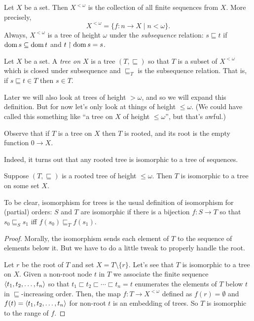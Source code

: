 \documentclass[10pt]{amsart}
\begin{document}
\begin{definition}
Let $X$ be a set. Then $X^{<\omega}$ is the collection of all finite sequences from $X$. More precisely,
\[
X^{<\omega} = \{ f : n \to X \mid n < \omega \}.
\]
Always, $X^{<\omega}$ is a tree of height $\omega$ under the \emph{subsequence} relation: $s \sqsubseteq t$ if $\operatorname{dom} s \subseteq \operatorname{dom} t$ and $t \upharpoonright \operatorname{dom} s = s$.
\end{definition}

\begin{definition}
Let $X$ be a set. A \emph{tree on $X$} is a tree $(T,\sqsubseteq)$ so that $T$ is a subset of $X^{<\omega}$ which is closed under subsequence and $\sqsubseteq_T$ is the subsequence relation. That is, if $s \sqsubseteq t \in T$ then $s \in T$.
\end{definition}

Later we will also look at trees of height $>\omega$, and so we will expand this definition. But for now let's only look at things of height $\le \omega$. (We could have called this something like ``a tree on $X$ of height $\le \omega$'', but that's awful.)

Observe that if $T$ is a tree on $X$ then $T$ is rooted, and its root is the empty function $0 \to X$.

Indeed, it turns out that any rooted tree is isomorphic to a tree of sequences.

\begin{lemma}
Suppose $(T,\sqsubseteq)$ is a rooted tree of height $\le \omega$. Then $T$ is isomorphic to a tree on some set $X$.
\end{lemma}

To be clear, isomorphism for trees is the usual definition of isomorphism for (partial) orders: $S$ and $T$ are isomorphic if there is a bijection $f : S \to T$ so that $s_0 \sqsubseteq_S s_1$ iff $f(s_0) \sqsubseteq_T f(s_1)$. 

\begin{proof}
Morally, the isomorphism sends each element of $T$ to the sequence of elements below it. But we have to do a little tweak to properly handle the root.

Let $r$ be the root of $T$ and set $X = T \setminus \{ r \}$. Let's see that $T$ is isomorphic to a tree on $X$. Given a non-root node $t$ in $T$ we associate the finite sequence ${\left\langle t_1, t_2, \ldots, t_n \right\rangle}$ so that $t_1 \sqsubset t_2 \sqsubset \cdots \sqsubset t_n = t$ enumerates the elements of $T$ below $t$ in $\sqsubseteq$-increasing order. Then, the map $f : T \to X^{<\omega}$ defined as $f(r) = \emptyset$ and $f(t) = {\left\langle t_1, t_2, \ldots, t_n \right\rangle}$ for non-root $t$ is an embedding of trees. So $T$ is isomorphic to the range of $f$.
\end{proof}
\end{document}
